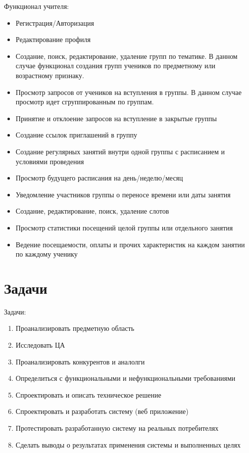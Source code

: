 \documentclass[14pt, timesnewroman]{article}
\begin{document}
Функционал учителя:
\begin{itemize}
    \item  Регистрация/Авторизация
    \item  Редактирование профиля
    \item  Создание, поиск, редактирование, удаление групп по тематике. В данном случае функционал создания групп учеников по предметному или возрастному признаку. 
    \item  Просмотр запросов от учеников на вступления в группы. В данном случае просмотр идет сгруппированным по группам.
    \item  Принятие и отклоение запросов на вступление в закрытые группы
    \item  Создание ссылок приглашений в группу
    \item  Создание регулярных занятий внутри одной группы с расписанием и условиями проведения
    \item  Просмотр будущего расписания на день/неделю/месяц
    \item  Уведомление участников группы о переносе времени или даты занятия
    \item  Создание, редактирование, поиск, удаление слотов
    \item  Просмотр статистики посещений целой группы или отдельного занятия
    \item  Ведение посещаемости, оплаты и прочих характеристик на каждом занятии по каждому ученику
\end{itemize}

\section{Задачи}


Задачи:
\begin{enumerate}
    \item Проанализировать предметную область
    \item Исследовать ЦА
    \item Проанализировать конкурентов и аналолги
    \item Определиться с функциональными и нефункциональными требованиями
    \item Спроектировать и описать техническое решение
    \item Спроектировать и разработать систему (веб приложение)
    \item Протестировать разработанную систему на реальных потребителях
    \item Сделать выводы о результатах применения системы и выполненных целях
\end{enumerate}
\end{document}
